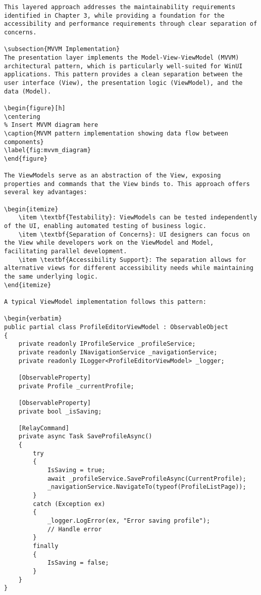 \begin{verbatim}
This layered approach addresses the maintainability requirements identified in Chapter 3, while providing a foundation for the accessibility and performance requirements through clear separation of concerns.

\subsection{MVVM Implementation}
The presentation layer implements the Model-View-ViewModel (MVVM) architectural pattern, which is particularly well-suited for WinUI applications. This pattern provides a clean separation between the user interface (View), the presentation logic (ViewModel), and the data (Model).

\begin{figure}[h]
\centering
% Insert MVVM diagram here
\caption{MVVM pattern implementation showing data flow between components}
\label{fig:mvvm_diagram}
\end{figure}

The ViewModels serve as an abstraction of the View, exposing properties and commands that the View binds to. This approach offers several key advantages:

\begin{itemize}
    \item \textbf{Testability}: ViewModels can be tested independently of the UI, enabling automated testing of business logic.
    \item \textbf{Separation of Concerns}: UI designers can focus on the View while developers work on the ViewModel and Model, facilitating parallel development.
    \item \textbf{Accessibility Support}: The separation allows for alternative views for different accessibility needs while maintaining the same underlying logic.
\end{itemize}

A typical ViewModel implementation follows this pattern:

\begin{verbatim}
public partial class ProfileEditorViewModel : ObservableObject
{
    private readonly IProfileService _profileService;
    private readonly INavigationService _navigationService;
    private readonly ILogger<ProfileEditorViewModel> _logger;
    
    [ObservableProperty]
    private Profile _currentProfile;
    
    [ObservableProperty]
    private bool _isSaving;
    
    [RelayCommand]
    private async Task SaveProfileAsync()
    {
        try
        {
            IsSaving = true;
            await _profileService.SaveProfileAsync(CurrentProfile);
            _navigationService.NavigateTo(typeof(ProfileListPage));
        }
        catch (Exception ex)
        {
            _logger.LogError(ex, "Error saving profile");
            // Handle error
        }
        finally
        {
            IsSaving = false;
        }
    }
}
\end{verbatim}

